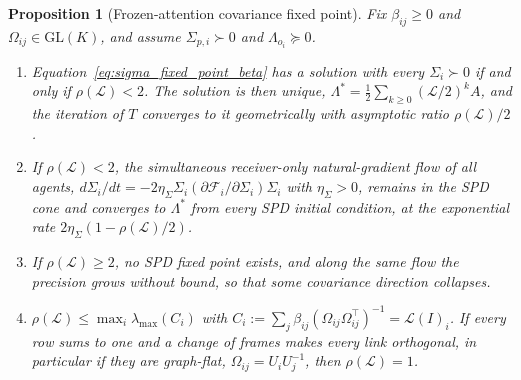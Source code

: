 \documentclass[11pt]{article}
\newtheorem{proposition}{Proposition}
\begin{document}
\begin{proposition}[Frozen-attention covariance fixed point]
\label{prop:covariance_fixed_point}
Fix $\beta_{ij} \geq 0$ and $\Omega_{ij} \in \mathrm{GL}(K)$, and assume $\Sigma_{p,i} \succ 0$ and $\Lambda_{o_i} \succeq 0$.
\begin{enumerate}
\item[(i)] Equation~\eqref{eq:sigma_fixed_point_beta} has a solution with every $\Sigma_i \succ 0$ if and only if $\rho(\mathcal{L}) < 2$. The solution is then unique, $\Lambda^* = \tfrac{1}{2}\sum_{k \geq 0}(\mathcal{L}/2)^k A$, and the iteration of $T$ converges to it geometrically with asymptotic ratio $\rho(\mathcal{L})/2$.
\item[(ii)] If $\rho(\mathcal{L}) < 2$, the simultaneous receiver-only natural-gradient flow of all agents, $d\Sigma_i/dt = -2\eta_\Sigma\Sigma_i(\partial\mathcal{F}_i/\partial\Sigma_i)\Sigma_i$ with $\eta_\Sigma > 0$, remains in the SPD cone and converges to $\Lambda^*$ from every SPD initial condition, at the exponential rate $2\eta_\Sigma(1 - \rho(\mathcal{L})/2)$.
\item[(iii)] If $\rho(\mathcal{L}) \geq 2$, no SPD fixed point exists, and along the same flow the precision grows without bound, so that some covariance direction collapses.
\item[(iv)] $\rho(\mathcal{L}) \leq \max_i\lambda_{\max}(C_i)$ with $C_i := \sum_j\beta_{ij}(\Omega_{ij}\Omega_{ij}^\top)^{-1} = \mathcal{L}(I)_i$. If every row sums to one and a change of frames makes every link orthogonal, in particular if they are graph-flat, $\Omega_{ij} = U_iU_j^{-1}$, then $\rho(\mathcal{L}) = 1$.
\end{enumerate}
\end{proposition}
\end{document}
